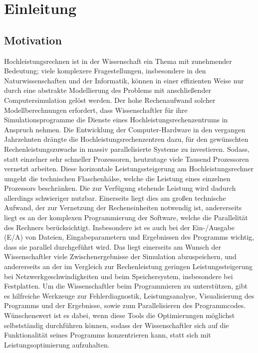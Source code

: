 \documentclass[
	12pt,
	a4paper,
	BCOR10mm,
	DIV14,
	listof=totoc,
	bibliography=totoc,
	headsepline
]{scrreprt}
\begin{document}
\thispagestyle{empty}


\tableofcontents

\chapter{Einleitung}
\label{Einleitung}

\section{Motivation}
Hochleistungsrechnen ist in der Wissenschaft ein Thema mit zunehmender Bedeutung; viele komplexere Fragestellungen, insbesondere in den Naturwissenschaften und der Informatik, können in einer effizienten Weise nur durch eine abstrakte Modellierung des Problems mit anschließender Computersimulation gelöst werden. Der hohe Rechenaufwand solcher Modellberechnungen erfordert, dass Wissenschaftler für ihre Simulationsprogramme die Dienste eines Hochleistungsrechenzentrums in Anspruch nehmen. 
Die Entwicklung der Computer-Hardware in den vergangen Jahrzehnten drängte die Hochleistungsrechenzentren dazu, für den gewünschten Rechenleistungszuwachs in massiv parallelisierte Systeme zu investieren. Sodass, statt einzelner sehr schneller Prozessoren, heutzutage viele Tausend Prozessoren vernetzt arbeiten. Diese horizontale Leistungssteigerung am Hochleistungsrechner umgeht die technischen Flaschenhälse, welche die Leistung eines einzelnen Prozessors beschränken.
Die zur Verfügung stehende Leistung wird dadurch allerdings schwieriger nutzbar. 
Einerseits liegt dies am großen  technische Aufwand, der zur Vernetzung der Recheneinheiten notwendig ist, andererseits liegt es an der komplexen Programmierung der Software, welche die Parallelität des Rechners berücksichtigt. Insbesondere ist es auch bei der Ein-/Ausgabe (E/A) von Dateien, Eingabeparametern und Ergebnissen des Programms wichtig, dass sie parallel durchgeführt wird. Das liegt einerseits am Wunsch der Wissenschaftler viele Zwischenergebnisse der Simulation abzuspeichern, und andererseits an der im Vergleich zur Rechenleistung geringen Leistungssteigerung bei Netzwerkgeschwindigkeiten und beim Speichersystem, insbesondere bei Festplatten.
Um die Wissenschaftler beim Programmieren zu unterstützen, gibt es hilfreiche Werkzeuge zur Fehlerdiagnostik, Leistungsanalyse, Visualisierung des Programms und der Ergebnisse, sowie zum Parallelisieren des Programmcodes. Wünschenswert ist es dabei, wenn diese Tools die Optimierungen möglichst selbstständig durchführen können, sodass der Wissenschaftler sich auf die Funktionalität seines Programms konzentrieren kann, statt sich mit Leistungsoptimierung aufzuhalten.
\end{document}
